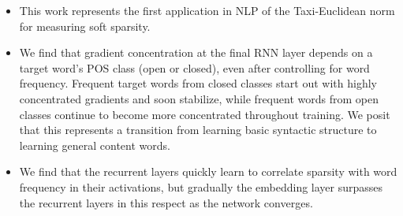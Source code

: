 \begin{itemize}
\begin{itemize}
        \item This work represents the first application in NLP of the Taxi-Euclidean norm for measuring soft sparsity.
        \item We find that gradient concentration at the final RNN layer depends on a target word's POS class (open or closed), even after controlling for word frequency. Frequent target words from closed classes start out with highly concentrated gradients and soon stabilize, while frequent words from open classes continue to become more concentrated throughout training. We posit that this represents a transition from learning basic syntactic structure to learning general content words.
        \item We find that the recurrent layers quickly learn to correlate sparsity with word frequency in their activations, but gradually the embedding layer surpasses the recurrent layers in this respect as the network converges. 
    \end{itemize}
\end{itemize}